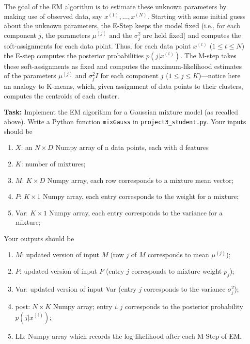 \begin{enumerate}
\begin{enumerate}
    The goal of the EM algorithm is to estimate these unknown parameters by making use of observed data, say $x^{(1)},\ldots, x^{(N)}$. Starting with some initial guess about the unknown parameters, the E-Step keeps the model fixed (i.e., for each component $j$, the parameters $\mu^{(j)}$ and the $\sigma^2_{j}$ are held fixed) and computes the soft-assignments for each data point. Thus, for each data point $x^{(t)}$ ($1 \le t \le N$) the E-step computes the posterior probabilities $p(j | x^{(t)})$. The M-step takes these soft-assignments as fixed and computes the maximum-likelihood estimates of the parameters $\mu^{(j)}$ and $\sigma_j^2I$ for each component $j$ ($1 \le j \le K$)---notice here an analogy to K-means, which, given assignment of data points to their clusters, computes the centroids of each cluster.

    \textbf{Task:} Implement the EM algorithm for a Gaussian mixture model (as recalled above). Write a Python function
    \texttt{mixGauss} in \texttt{project3\_student.py}. Your inputs should be
    \begin{enumerate}
    \item $X$: an $N \times D$ Numpy array of n data points, each with d features
    \item $K$: number of mixtures; 
    \item $M$: $K \times D$ Numpy array, each row corresponds to a mixture mean vector;
    \item $P$: $K \times 1$ Numpy array, each entry corresponds to the weight for a mixture;
    \item Var: $K \times 1$ Numpy array, each entry corresponds to the variance for a mixture;
    \end{enumerate}
    Your outputs should be
    \begin{enumerate}
    \item $M$: updated version of input $M$ (row $j$ of $M$ corresponds to mean $\mu^{(j)}$);
    \item $P$: updated version of input $P$ (entry $j$ corresponds to mixture weight $p_j$);
    \item Var: updated version of input Var (entry $j$ corresponds to the variance $\sigma_j^2$);
    \item post: $N \times K$ Numpy array; entry $i,j$ corresponds to the posterior probability $p(j|x^{(i)})$;
    \item LL: Numpy array which records the log-likelihood after each M-Step of EM.
    \end{enumerate}


\end{enumerate}
\end{enumerate}
